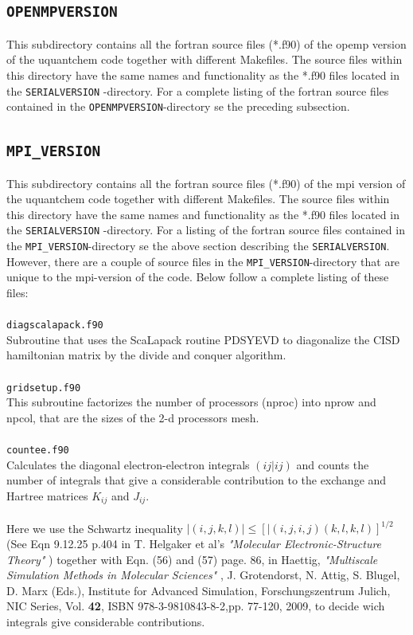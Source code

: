 \documentclass[a4paper,twoside,openany]{book}
\begin{document}
{{\subsection{\texttt{OPENMPVERSION}}
This subdirectory contains all the fortran source files (*.f90) of the opemp version of the uquantchem code together with different Makefiles. The source files within this directory have the same names
and functionality as the *.f90 files located in the \texttt{SERIALVERSION} -directory. For a complete listing of the fortran source files contained in the \texttt{OPENMPVERSION}-directory se the preceding 
subsection.

\subsection{\texttt{MPI\_VERSION}}
This subdirectory contains all the fortran source files (*.f90) of the mpi version of the uquantchem code together with different Makefiles. The source files within this directory have the same names
and functionality as the *.f90 files located in the \texttt{SERIALVERSION} -directory. For a  listing of the fortran source files contained in the \texttt{MPI\_VERSION}-directory se the above  section describing 
the \texttt{SERIALVERSION}. However, there are a couple of source files in the \texttt{MPI\_VERSION}-directory that are unique to the mpi-version of the code. Below follow a complete listing of these files: \\ \\
\texttt{diagscalapack.f90}\\
Subroutine that uses the ScaLapack routine PDSYEVD to diagonalize the CISD hamiltonian matrix by the divide and conquer algorithm. \\ \\
\texttt{gridsetup.f90}\\
This subroutine factorizes the number of processors (nproc)
into nprow and npcol, that are the sizes of the 2-d processors mesh. \\ \\
\texttt{countee.f90}\\
Calculates the diagonal electron-electron integrals $(ij|ij)$ and counts the number of integrals that give a considerable contribution to the exchange and Hartree matrices $K_{ij}$ and $J_{ij}$. \\ \\
Here we use the Schwartz inequality $|(i,j,k,l)| \leq [ |(i,j,i,j)(k,l,k,l)]^{1/2}$
(See Eqn 9.12.25 p.404 in T. Helgaker et al's {\it "Molecular Electronic-Structure Theory"} )
 together with Eqn. (56) and (57) page. 86,
in Haettig, {\it "Multiscale Simulation Methods in Molecular
Sciences" }, J. Grotendorst, N. Attig, S. Blugel, D. Marx (Eds.),
Institute for Advanced Simulation, Forschungszentrum Julich, NIC Series, Vol. {\bf 42}, ISBN 978-3-9810843-8-2,pp.  77-120, 2009, to decide wich integrals 
give considerable contributions. 


}}
\end{document}
